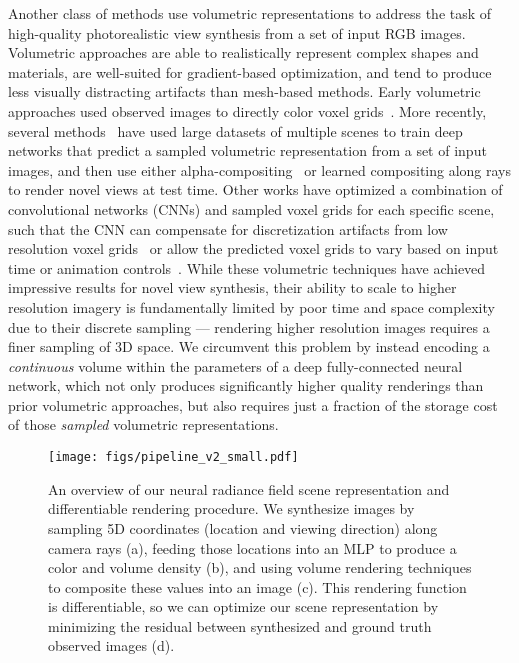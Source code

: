 \documentclass[runningheads]{llncs}
\begin{document}
Another class of methods use volumetric representations to address the task of high-quality photorealistic view synthesis from a set of input RGB images.
Volumetric approaches are able to realistically represent complex shapes and materials, are well-suited for gradient-based optimization, and tend to produce less visually distracting artifacts than mesh-based methods.
Early volumetric approaches used observed images to directly color voxel grids~\cite{kutulakos00,seitz99,szeliski98}. More recently, several methods~\cite{flynn19,henzler18,kar17,mildenhall19,penner17,srinivasan19,tulsiani17,zhou18} have used large datasets of multiple scenes to train deep networks that predict a sampled volumetric representation from a set of input images, and then use either alpha-compositing~\cite{porter84} or learned compositing along rays to render novel views at test time.
Other works have optimized a combination of convolutional networks (CNNs) and sampled voxel grids for each specific scene, such that the CNN can compensate for discretization artifacts from low resolution voxel grids~\cite{deepvoxels} or allow the predicted voxel grids to vary based on input time or animation controls~\cite{neuralvolumes}.
While these volumetric techniques have achieved impressive results for novel view synthesis, their ability to scale to higher resolution imagery is fundamentally limited by poor time and space complexity due to their discrete sampling --- rendering higher resolution images requires a finer sampling of 3D space.
We circumvent this problem by instead encoding a \emph{continuous} volume within the parameters of a deep fully-connected neural network, which not only produces significantly higher quality renderings than prior volumetric approaches, but also requires just a fraction of the storage cost of those \emph{sampled} volumetric representations.


\begin{figure}[t]
\centering
\texttt{[image: figs/pipeline\_v2\_small.pdf]}
\caption{
An overview of our neural radiance field scene representation and differentiable rendering procedure. We synthesize images by sampling 5D coordinates (location and viewing direction) along camera rays (a), feeding those locations into an MLP to produce a color and volume density (b), and using volume rendering techniques to composite these values into an image (c). This rendering function is differentiable, so we can optimize our scene representation by minimizing the residual between synthesized and ground truth observed images (d).
}
\label{fig:pipeline}
\end{figure}
\end{document}
